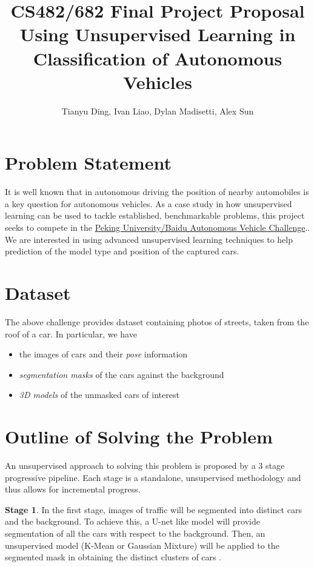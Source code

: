 \documentclass[twocolumn]{article}
\title{CS482/682 Final Project Proposal\\
\large Using Unsupervised Learning in Classification of Autonomous Vehicles}
\author{Tianyu Ding, Ivan Liao, Dylan Madisetti, Alex Sun}
\date{}
\begin{document}
  \maketitle

  \section{Problem Statement}

  It is well known that in autonomous driving the position of nearby
automobiles is a key question for autonomous vehicles.  As a case study in how
unsupervised learning can be used to tackle established, benchmarkable
problems, this project seeks to compete in the
\href{https://www.kaggle.com/c/pku-autonomous-driving}{Peking University/Baidu
Autonomous Vehicle Challenge}.. We are interested in using advanced
unsupervised learning techniques to help prediction of the model type and
position of the captured cars.

  \vspace{-.1in} \section{Dataset}

  The above challenge provides dataset containing photos of streets, taken from
the roof of a car. In particular, we have \begin{itemize} \item the images of
cars and their \emph{pose} information \item  \emph{segmentation masks} of the
cars against the background \item \emph{3D models} of the unmasked cars of
interest \end{itemize}


  \section{Outline of Solving the Problem}

   An unsupervised approach to solving this problem is proposed by a 3 stage
progressive pipeline. Each stage is a standalone, unsupervised methodology and
thus allows for incremental progress.

  \textbf{Stage 1}. In the first stage, images of traffic will be segmented
into distinct cars and the background. To achieve this, a U-net like model will
provide segmentation of all the cars with respect to the background. Then, an
unsupervised model (K-Mean or Gaussian Mixture) will be applied to the
segmented mask in obtaining the distinct clusters of cars \cite{Ji2019}.
\end{document}
